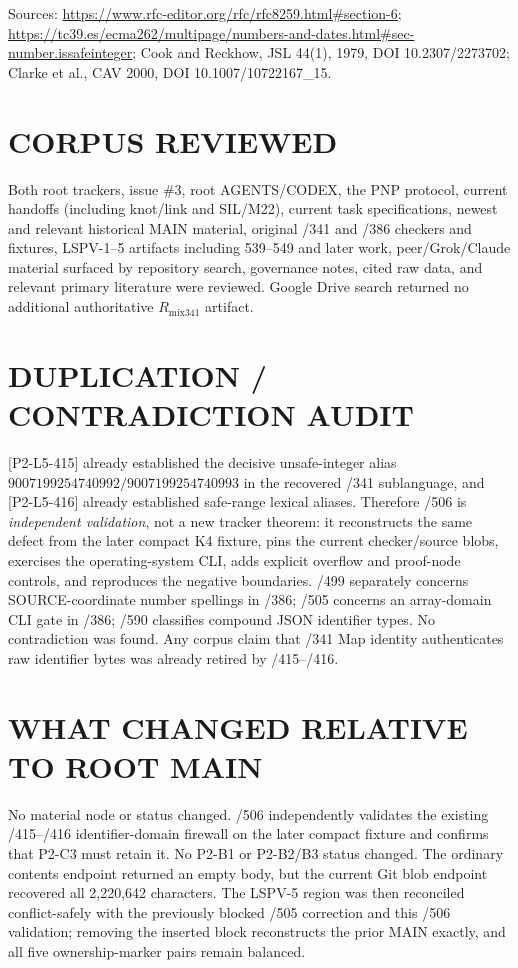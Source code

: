 \documentclass[11pt]{article}
\begin{document}
Sources: \url{https://www.rfc-editor.org/rfc/rfc8259.html\#section-6};
\url{https://tc39.es/ecma262/multipage/numbers-and-dates.html\#sec-number.issafeinteger}; Cook and Reckhow, JSL 44(1), 1979, DOI 10.2307/2273702; Clarke et al., CAV 2000, DOI 10.1007/10722167\_15.

\section{CORPUS REVIEWED}
Both root trackers, issue \#3, root AGENTS/CODEX, the PNP protocol, current handoffs (including knot/link and SIL/M22), current task specifications, newest and relevant historical MAIN material, original /341 and /386 checkers and fixtures, LSPV-1--5 artifacts including 539--549 and later work, peer/Grok/Claude material surfaced by repository search, governance notes, cited raw data, and relevant primary literature were reviewed.  Google Drive search returned no additional authoritative $R_{\mathrm{mix341}}$ artifact.

\section{DUPLICATION / CONTRADICTION AUDIT}
[P2-L5-415] already established the decisive unsafe-integer alias $9007199254740992/9007199254740993$ in the recovered /341 sublanguage, and [P2-L5-416] already established safe-range lexical aliases.  Therefore /506 is \emph{independent validation}, not a new tracker theorem: it reconstructs the same defect from the later compact K4 fixture, pins the current checker/source blobs, exercises the operating-system CLI, adds explicit overflow and proof-node controls, and reproduces the negative boundaries.  /499 separately concerns SOURCE-coordinate number spellings in /386; /505 concerns an array-domain CLI gate in /386; /590 classifies compound JSON identifier types.  No contradiction was found.  Any corpus claim that /341 Map identity authenticates raw identifier bytes was already retired by /415--/416.

\section{WHAT CHANGED RELATIVE TO ROOT MAIN}
No material node or status changed.  /506 independently validates the existing /415--/416 identifier-domain firewall on the later compact fixture and confirms that P2-C3 must retain it.  No P2-B1 or P2-B2/B3 status changed.  The ordinary contents endpoint returned an empty body, but the current Git blob endpoint recovered all 2,220,642 characters.  The LSPV-5 region was then reconciled conflict-safely with the previously blocked /505 correction and this /506 validation; removing the inserted block reconstructs the prior MAIN exactly, and all five ownership-marker pairs remain balanced.
\end{document}
